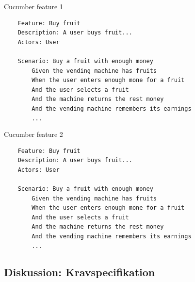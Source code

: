 \begin{listing}[H]
    \centering
    \caption{Cucumber feature 1}\label{lst:feature1}
    \begin{verbatim}
    Feature: Buy fruit
    Description: A user buys fruit...
    Actors: User
        
    Scenario: Buy a fruit with enough money
        Given the vending machine has fruits
        When the user enters enough mone for a fruit
        And the user selects a fruit
        And the machine returns the rest money
        And the vending machine remembers its earnings
        ...
    \end{verbatim}
\end{listing}

\begin{listing}[H]
    \centering
    \caption{Cucumber feature 2}\label{lst:feature2}
    \begin{verbatim}
    Feature: Buy fruit
    Description: A user buys fruit...
    Actors: User
    
    Scenario: Buy a fruit with enough money
        Given the vending machine has fruits
        When the user enters enough mone for a fruit
        And the user selects a fruit
        And the machine returns the rest money
        And the vending machine remembers its earnings
        ...
    \end{verbatim}
\end{listing}

\subsection{Diskussion: Kravspecifikation}